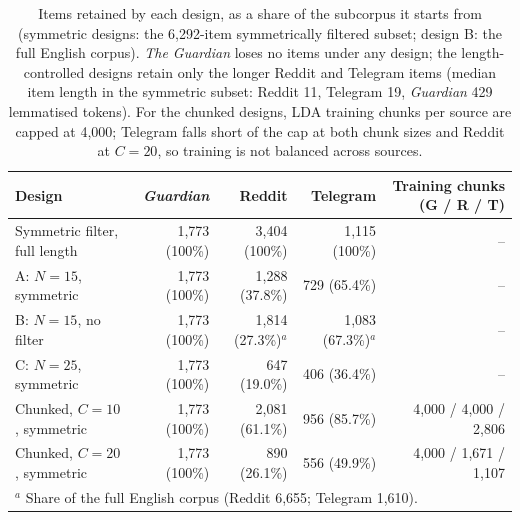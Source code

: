 \begin{table}[H]
\caption{Items retained by each design, as a share of the subcorpus it starts from
(symmetric designs: the 6,292-item symmetrically filtered subset; design B: the full
English corpus). \textit{The Guardian} loses no items under any design; the
length-controlled designs retain only the longer Reddit and Telegram items
(median item length in the symmetric subset: Reddit 11, Telegram 19, \textit{Guardian} 429 lemmatised tokens).
For the chunked designs, LDA training chunks per source are capped at 4,000; Telegram
falls short of the cap at both chunk sizes and Reddit at $C=20$, so training is not
balanced across sources.\label{tab:design_costs}}
\centering
\small
\begin{tabular}{l rrr r}
\toprule
Design & \textit{Guardian} & Reddit & Telegram & Training chunks (G / R / T) \\
\midrule
Symmetric filter, full length & 1,773 (100\%) & 3,404 (100\%) & 1,115 (100\%) & -- \\
A: $N=15$, symmetric          & 1,773 (100\%) & 1,288 (37.8\%) & 729 (65.4\%) & -- \\
B: $N=15$, no filter          & 1,773 (100\%) & 1,814 (27.3\%)$^{a}$ & 1,083 (67.3\%)$^{a}$ & -- \\
C: $N=25$, symmetric          & 1,773 (100\%) & 647 (19.0\%) & 406 (36.4\%) & -- \\
Chunked, $C=10$, symmetric    & 1,773 (100\%) & 2,081 (61.1\%) & 956 (85.7\%) & 4,000 / 4,000 / 2,806 \\
Chunked, $C=20$, symmetric    & 1,773 (100\%) & 890 (26.1\%) & 556 (49.9\%) & 4,000 / 1,671 / 1,107 \\
\bottomrule
\multicolumn{5}{l}{\footnotesize $^{a}$ Share of the full English corpus (Reddit 6,655; Telegram 1,610).}
\end{tabular}
\end{table}
